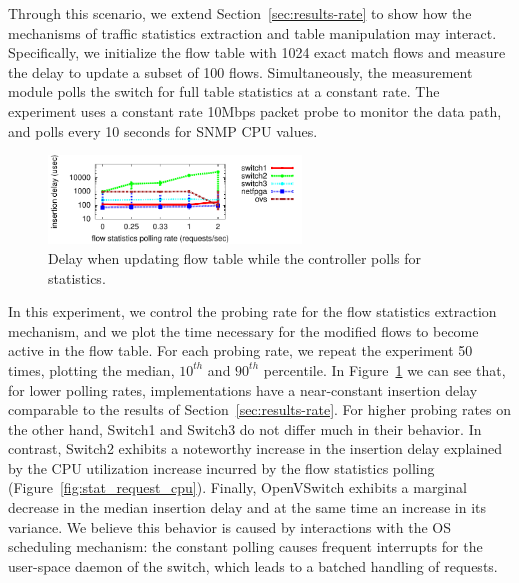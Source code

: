 Through this scenario, we extend Section~\ref{sec:results-rate} to show 
how the mechanisms of traffic statistics extraction and table manipulation 
may interact. Specifically, we initialize the flow table with 1024 exact
match flows and measure the delay to update a subset of 100 flows. 
Simultaneously, the measurement module polls the switch for full table 
statistics at a constant rate. The experiment uses a constant rate 10Mbps 
packet probe to monitor the data path, and polls every 10 seconds for SNMP 
CPU values.

\begin{figure}[t!!]
  \begin{center}
    \includegraphics[width=0.60\textwidth]{interaction_test}
  \end{center}
  \caption{Delay when updating  flow table while the controller polls
    for statistics.}
  \label{fig:interaction_test}
\end{figure}

In this experiment, we control the probing rate for the flow statistics 
extraction mechanism, and we plot the time necessary for the modified 
flows to become active in the flow table. For each probing rate, we
repeat the experiment 50 times, plotting the median, $10^{th}$ and 
$90^{th}$ percentile. In Figure~\ref{fig:interaction_test} we can see
that, for lower polling rates, implementations have a near-constant
insertion delay comparable to the results of Section~\ref{sec:results-rate}.
For higher probing rates on the other hand, Switch1 and Switch3 do 
not differ much in their behavior. In contrast, Switch2 exhibits a noteworthy 
increase in the insertion delay explained by the CPU utilization increase
incurred by the flow statistics polling (Figure~\ref{fig:stat_request_cpu}). Finally,
OpenVSwitch exhibits a marginal decrease in the median insertion delay
and at the same time an increase in its variance. We believe this behavior 
is caused by interactions with the OS scheduling mechanism: the constant 
polling causes frequent interrupts for the user-space daemon of the switch, 
which leads to a batched handling of requests.

